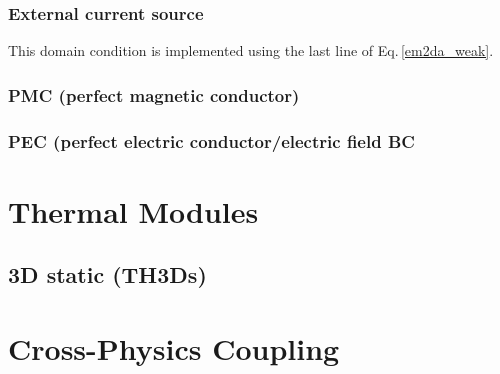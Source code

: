 \documentclass[11pt,a4paper,draft]{report}
\begin{document}
 \subsection{External current source}
 This domain condition is implemented using the last line of Eq.\,\ref{em2da_weak}. 
 
 \subsection{PMC (perfect magnetic conductor)}
 
 \subsection{PEC (perfect electric conductor/electric field BC}
  
  
\chapter{Thermal Modules}
\section{3D static (TH3Ds)}
\chapter{Cross-Physics Coupling}
\end{document}
